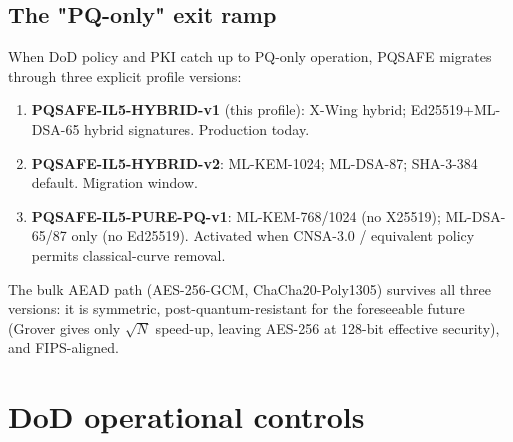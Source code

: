 \documentclass[11pt,a4paper]{article}
\begin{document}
\subsection{The "PQ-only" exit ramp}

When DoD policy and PKI catch up to PQ-only operation, PQSAFE migrates
through three explicit profile versions:

\begin{enumerate}[leftmargin=*,itemsep=0pt]
\item \textbf{PQSAFE-IL5-HYBRID-v1} (this profile): X-Wing hybrid;
  Ed25519+ML-DSA-65 hybrid signatures. Production today.
\item \textbf{PQSAFE-IL5-HYBRID-v2}: ML-KEM-1024; ML-DSA-87; SHA-3-384
  default. Migration window.
\item \textbf{PQSAFE-IL5-PURE-PQ-v1}: ML-KEM-768/1024 (no X25519);
  ML-DSA-65/87 only (no Ed25519). Activated when CNSA-3.0
  / equivalent policy permits classical-curve removal.
\end{enumerate}

The bulk AEAD path (AES-256-GCM, ChaCha20-Poly1305) survives all
three versions: it is symmetric, post-quantum-resistant for the
foreseeable future (Grover gives only $\sqrt{N}$ speed-up, leaving
AES-256 at 128-bit effective security), and FIPS-aligned.

\section{DoD operational controls}
\label{sec:dodops}
\end{document}
